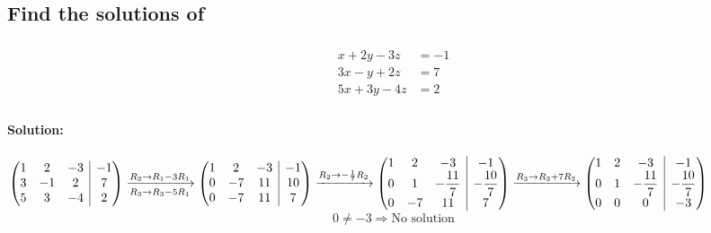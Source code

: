 \documentclass[fleqn]{article}
\makeatletter
\newenvironment{amatrix}[1]{%
	\left(\begin{array}{@{}*{#1}{c}|c@{}}
}{%
	\end{array}\right)
}
\makeatother
\begin{document}
\subsection{Find the solutions of }

\subsubsection{}

\begin{align*}
	x + 2y - 3z &= -1\\
	3x - y + 2z &= 7\\
	5x + 3y - 4z &= 2\\
\end{align*}

\paragraph*{Solution:\\}
$
	\begin{amatrix}{3}
		1 & 2 & -3 & -1\\
		3 & -1 & 2 & 7\\
		5 & 3 & -4 & 2\\
	\end{amatrix}
	\xrightarrow [R_3 \rightarrow R_3 - 5 R_1] {R_2 \rightarrow R_1 - 3 R_1}
	\begin{amatrix}{3}
		1 & 2 & -3 & -1\\
		0 & -7 & 11 & 10\\
		0 & -7 & 11 & 7\\
	\end{amatrix}
	\xrightarrow{R_2 \rightarrow -\frac{1}{7} R_2}
	\begin{amatrix}{3}
		1 & 2 & -3 & -1\\
		0 & 1 & -\dfrac{11}{7} & -\dfrac{10}{7}\\
		0 & -7 & 11 & 7\\
	\end{amatrix}
	\xrightarrow{R_3 \rightarrow R_3 + 7 R_2}
	\begin{amatrix}{3}
		1 & 2 & -3 & -1\\
		0 & 1 & -\dfrac{11}{7} & -\dfrac{10}{7}\\
		0 & 0 & 0 & -3\\
	\end{amatrix}
$
\begin{equation*}
	0 \neq -3 \Rightarrow \text{No solution}
\end{equation*}
\end{document}
